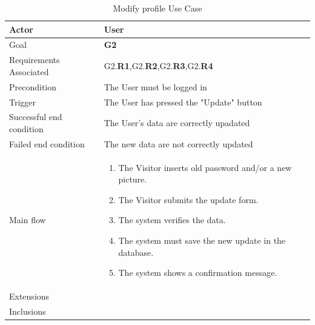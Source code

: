 \newline
\begin{table}[htb]
\begin{center}
\renewcommand{\arraystretch}{1.5}
\begin{tabular}{|l|p{}|}
\hline
Actor & User \\ \hline
Goal & \textbf{G2} \\ \hline
Requirements Associated & G2.\textbf{R1},G2.\textbf{R2},G2.\textbf{R3},G2.\textbf{R4} \\ \hline
Precondition & The User must be logged in \\ \hline
Trigger & The User has pressed the "Update" button \\ \hline
Successful end condition & The User's data are correctly upadated \\ \hline
Failed end condition & The new data are not correctly updated \\ \hline
Main flow & \begin{minipage}[t]{0.6\textwidth}
\begin{enumerate}
\addtolength{\itemindent}{0.5cm}
\item The Visitor inserts old password and/or a new picture.
\item The Visitor submits the update form.
\item The system verifies the data.
\item The system must save the new update in the database.
\item The system shows a confirmation message.
\vspace{1,5mm}
\end{enumerate}
\end{minipage} \\ \hline
Extensions & \\ \hline
Inclusions &  \\ \hline
\end{tabular}
\caption{Modify profile Use Case}
\end{center}
\end{table}
\clearpage

